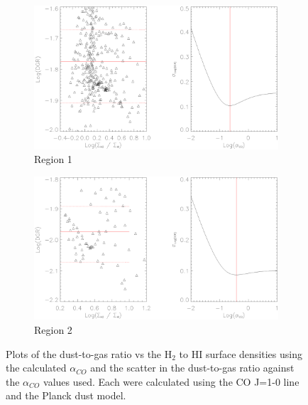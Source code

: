 \begin{figure}\label{fig:dgr_co10}
  \begin{subfigure}[t]{1\textwidth}
    \centering
    \includegraphics[width=1.\textwidth]{dgr_imgs/region_1_aco_output_10.eps}
    \caption{Region 1}
  \end{subfigure}

  \begin{subfigure}[t]{1\textwidth}
    \centering
    \includegraphics[width=1.\textwidth]{dgr_imgs/region_2_aco_output_10.eps}
    \caption{Region 2}
  \end{subfigure}
   \caption[Dust-to-Gas Ratio Determination Plots for CO J=1-0]{Plots of the dust-to-gas ratio vs the H$_2$ to HI surface densities using the calculated $\alpha_{CO}$ and the scatter in the dust-to-gas ratio against the $\alpha_{CO}$ values used.  Each were calculated using the CO J=1-0 line and the Planck dust model.}
   \label{fig:dgr_co10}
\end{figure}


